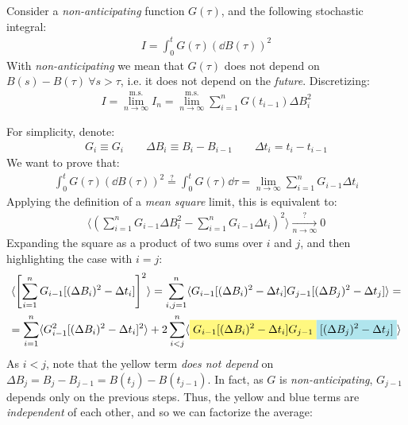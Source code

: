 \documentclass[../template.tex]{subfiles}
\begin{document}
\begin{example}[Integral in $\dd{B}^2$]
    Consider a \textit{non-anticipating} function $G(\tau)$, and the following stochastic integral:
    \begin{align*}
        I = \int_0^t G(\tau) (\dd{B}(\tau))^2
    \end{align*}   
    With \textit{non-anticipating} we mean that $G(\tau)$ does not depend on $B(s) - B(\tau) \> \forall s > \tau$, i.e. it does not depend on the \textit{future}. Discretizing:
    \begin{align*}
        I = \lim_{n \to \infty}^{\mathrm{m.s.}} I_n = \lim_{n \to\infty}^{\mathrm{m.s.}} \sum_{i=1}^n G(t_{i-1}) \Delta B_i^2
    \end{align*}    

    For simplicity, denote:
    \begin{align*}
        G_{i} \equiv G_{i} \qquad \Delta B_i \equiv B_i - B_{i-1} \qquad \Delta t_i = t_i - t_{i-1}
    \end{align*}
    We want to prove that:
    \begin{align*}
        \int_0^t G(\tau) (\dd{B(\tau)})^2 \overset{?}{=}  \int_0^t G(\tau) \dd{\tau} = \lim_{n \to \infty} \sum_{i=1}^n G_{i-1} \Delta t_i
    \end{align*}
    Applying the definition of a \textit{mean square} limit, this is equivalent to:
    \begin{align*}
        \langle \left(\sum_{i=1}^n G_{i-1} \Delta B_i^2 - \sum_{i=1}^n G_{i-1} \Delta t_i\right)^2 \rangle  \xrightarrow[n \to \infty]{?}  0 
    \end{align*} 
    Expanding the square as a product of two sums over $i$ and $j$, and then highlighting the case with $i = j$: 
    \begin{align} \nonumber
        \langle \left[\sum_{i=1}^n G_{i-1} [(\Delta B_i)^2 - \Delta t_i]\right]^2 \rangle = \sum_{i,j = 1}^n \langle G_{i-1}[(\Delta B_i)^2 - \Delta t_i] G_{j-1} [(\Delta B_j)^2 - \Delta t_j] \rangle =\\
        = \sum_{i=1}^n \langle G_{i-1}^2 [(\Delta B_i)^2 - \Delta t_i]^2 \rangle + 2\sum_{i<j}^n \langle\hlc{Yellow}{ G_{i-1} [(\Delta B_i)^2 - \Delta t_i] G_{j-1} }\hlc{SkyBlue}{[(\Delta B_j)^2 - \Delta t_j]} \rangle
        \label{eqn:ito1}
    \end{align}
    As $i < j$, note that the yellow term \textit{does not depend} on $\Delta B_j = B_j - B_{j-1} = B(t_j) - B(t_{j-1})$. In fact, as $G$ is \textit{non-anticipating}, $G_{j-1}$ depends only on the previous steps. Thus, the yellow and blue terms are \textit{independent} of each other, and so we can factorize the average:

\end{example}
\end{document}
